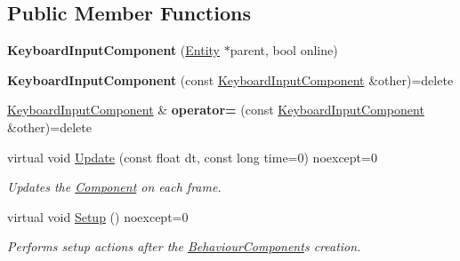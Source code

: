 \subsection*{Public Member Functions}
\begin{DoxyCompactItemize}
\item 
\mbox{\label{class_blade_1_1_keyboard_input_component_aa1cebe940ff791202ee387027071d34b}} 
{\bfseries Keyboard\+Input\+Component} (\hyperlink{class_blade_1_1_entity}{Entity} $\ast$parent, bool online)
\item 
\mbox{\label{class_blade_1_1_keyboard_input_component_ac63ae86c2904bec43868bb7fea04b8ea}} 
{\bfseries Keyboard\+Input\+Component} (const \hyperlink{class_blade_1_1_keyboard_input_component}{Keyboard\+Input\+Component} \&other)=delete
\item 
\mbox{\label{class_blade_1_1_keyboard_input_component_ad67b563f4552bd110e2056966ac843af}} 
\hyperlink{class_blade_1_1_keyboard_input_component}{Keyboard\+Input\+Component} \& {\bfseries operator=} (const \hyperlink{class_blade_1_1_keyboard_input_component}{Keyboard\+Input\+Component} \&other)=delete
\item 
virtual void \hyperlink{class_blade_1_1_keyboard_input_component_a0945515e8c0513eaa5b536fd4cb2022c}{Update} (const float dt, const long time=0) noexcept=0
\begin{DoxyCompactList}\small\item\em Updates the \hyperlink{class_blade_1_1_component}{Component} on each frame. \end{DoxyCompactList}\item 
\mbox{\label{class_blade_1_1_keyboard_input_component_ae155a4d29a0c1b014b0bc643773aea3f}} 
virtual void \hyperlink{class_blade_1_1_keyboard_input_component_ae155a4d29a0c1b014b0bc643773aea3f}{Setup} () noexcept=0
\begin{DoxyCompactList}\small\item\em Performs setup actions after the \hyperlink{class_blade_1_1_behaviour_component}{Behaviour\+Component}\textquotesingle{}s creation. \end{DoxyCompactList}\item 
\mbox{\label{class_blade_1_1_keyboard_input_component_ae62cebd0c5fa0595460275060be472f4}} 

\end{DoxyCompactItemize}
